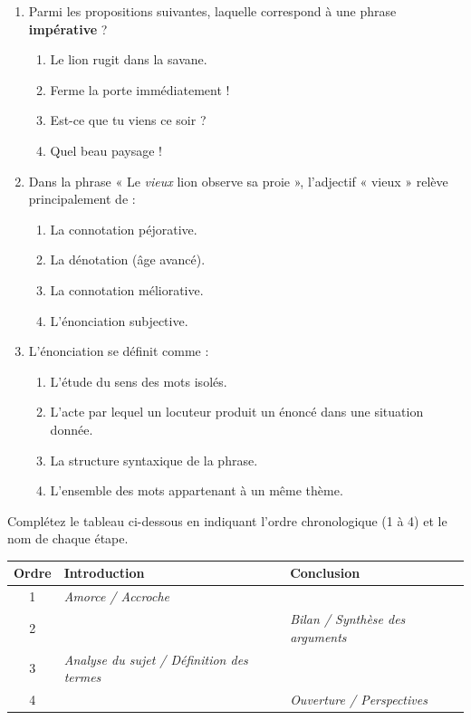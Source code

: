 \documentclass[11pt]{article}
\begin{document}
\begin{exercice}
\begin{enumerate}
    \item Parmi les propositions suivantes, laquelle correspond à une phrase \textbf{impérative} ?
    \begin{enumerate}
        \item Le lion rugit dans la savane.
        \item Ferme la porte immédiatement !
        \item Est-ce que tu viens ce soir ?
        \item Quel beau paysage !
    \end{enumerate}
    \item Dans la phrase « Le \textit{vieux} lion observe sa proie », l'adjectif « vieux » relève principalement de :
    \begin{enumerate}
        \item La connotation péjorative.
        \item La dénotation (âge avancé).
        \item La connotation méliorative.
        \item L'énonciation subjective.
    \end{enumerate}
    \item L'énonciation se définit comme :
    \begin{enumerate}
        \item L'étude du sens des mots isolés.
        \item L'acte par lequel un locuteur produit un énoncé dans une situation donnée.
        \item La structure syntaxique de la phrase.
        \item L'ensemble des mots appartenant à un même thème.
    \end{enumerate}
\end{enumerate}
\end{exercice}

\begin{exercice}
Complétez le tableau ci-dessous en indiquant l'ordre chronologique (1 à 4) et le nom de chaque étape.

\begin{tabular}{|c|p{5cm}|p{5cm}|}
\hline
\textbf{Ordre} & \textbf{Introduction} & \textbf{Conclusion} \\
\hline
1 & \textit{Amorce / Accroche} & \hfill \\
\hline
2 & \hfill & \textit{Bilan / Synthèse des arguments} \\
\hline
3 & \textit{Analyse du sujet / Définition des termes} & \hfill \\
\hline
4 & \hfill & \textit{Ouverture / Perspectives} \\
\hline
\end{tabular}
\end{exercice}
\end{document}
